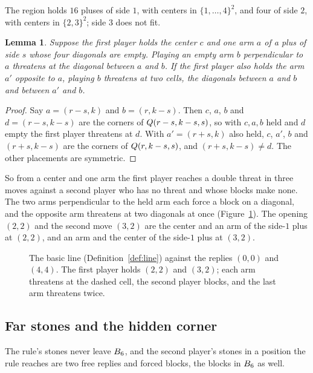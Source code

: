 \documentclass[11pt]{amsart}
\newtheorem{lemma}[theorem]{Lemma}
\theoremstyle{definition}
\theoremstyle{remark}
\begin{document}
The region holds $16$ pluses of side $1$, with centers in
$\{1,\dots,4\}^2$, and four of side $2$, with centers in $\{2,3\}^2$;
side $3$ does not fit.

\begin{lemma}\label{lem:arms}
Suppose the first player holds the center $c$ and one arm $a$ of a plus
of side $s$ whose four diagonals are empty. Playing an empty arm $b$
perpendicular
to $a$ threatens at the
diagonal between $a$ and $b$. If the first player also holds the arm
$a'$ opposite to $a$, playing $b$ threatens at two cells, the diagonals
between $a$ and $b$ and between $a'$ and $b$.
\end{lemma}

\begin{proof}
Say $a = (r-s,k)$ and $b = (r,k-s)$. Then $c$, $a$, $b$ and
$d = (r-s,k-s)$ are the corners of $Q(r-s,k-s,s)$, so with $c, a, b$
held and $d$ empty the first player threatens at $d$. With
$a' = (r+s,k)$ also held, $c$, $a'$, $b$ and $(r+s,k-s)$ are the
corners of $Q(r,k-s,s)$, and $(r+s,k-s) \ne d$. The other placements
are symmetric.
\end{proof}

So from a center and one arm the first player reaches a double threat
in three moves against a second player who has no threat and whose
blocks make none.
The two arms perpendicular to the held arm each force a block on a
diagonal, and the opposite arm threatens at two diagonals at once
(Figure~\ref{fig:basic}). The opening $(2,2)$ and the second move
$(3,2)$ are the center and an arm of the side-$1$ plus at $(2,2)$, and
an arm and the center of the side-$1$ plus at $(3,2)$.

\begin{figure}[ht]
\centering

\caption{The basic line (Definition~\ref{def:line}) against the replies
$(0,0)$ and $(4,4)$. The first player holds $(2,2)$ and $(3,2)$; each
arm threatens at the dashed cell, the second player blocks, and the
last arm threatens twice.}
\label{fig:basic}
\end{figure}

\subsection{Far stones and the hidden corner}

The rule's stones never leave $B_6$, and the second player's
stones in a position the rule reaches are two free replies and forced
blocks, the blocks in $B_6$ as well.
\end{document}
